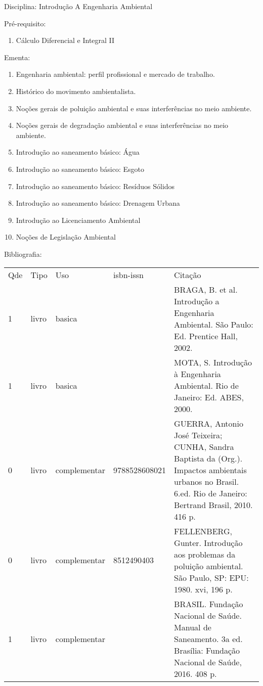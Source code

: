 \documentclass[12pt,a4paper,twoside]{report}
\begin{document}
Disciplina: Introdução A Engenharia Ambiental

Pré-requisito:
\begin{enumerate}
\item Cálculo Diferencial e Integral II
\end{enumerate}

Ementa:
\begin{enumerate}
\item Engenharia ambiental: perfil profissional e mercado de trabalho.
\item Histórico do movimento ambientalista.
\item Noções gerais de poluição ambiental e suas interferências no meio ambiente.
\item Noções gerais de degradação ambiental e suas interferências no meio ambiente.
\item Introdução ao saneamento básico: Água
\item Introdução ao saneamento básico: Esgoto
\item Introdução ao saneamento básico: Resíduos Sólidos
\item Introdução ao saneamento básico: Drenagem Urbana
\item Introdução ao Licenciamento Ambiental
\item Noções de Legislação Ambiental
\end{enumerate}

Bibliografia:
\begin{tabular}{lllll}
Qde & Tipo & Uso & isbn-issn & Citação \\
1&livro&basica&&BRAGA, B. et al. Introdução a Engenharia Ambiental. São Paulo: Ed. Prentice Hall, 2002.\\
1&livro&basica&&MOTA, S. Introdução à Engenharia Ambiental. Rio de Janeiro: Ed. ABES, 2000.\\
0&livro&complementar&9788528608021&GUERRA, Antonio José Teixeira; CUNHA, Sandra Baptista da (Org.). Impactos ambientais urbanos no Brasil. 6.ed. Rio de Janeiro: Bertrand Brasil, 2010. 416 p.\\
0&livro&complementar&8512490403&FELLENBERG, Gunter. Introdução aos problemas da poluição ambiental. São Paulo, SP: EPU: 1980. xvi, 196 p.\\
1&livro&complementar&&BRASIL. Fundação Nacional de Saúde. Manual de Saneamento. 3a ed. Brasília: Fundação Nacional de Saúde, 2016. 408 p.\\
\end{tabular}
\end{document}
